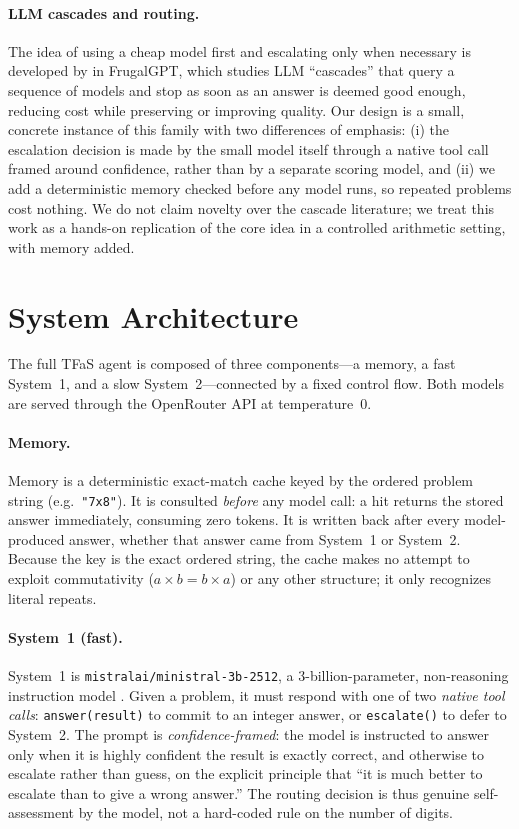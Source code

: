 \documentclass[11pt]{article}
\newcommand{\sysone}{System~1}
\newcommand{\systwo}{System~2}
\begin{document}
\paragraph{LLM cascades and routing.} The idea of using a cheap model first and
escalating only when necessary is developed by \citet{chen2023frugalgpt} in
FrugalGPT, which studies LLM ``cascades'' that query a sequence of models and
stop as soon as an answer is deemed good enough, reducing cost while preserving
or improving quality. Our design is a small, concrete instance of this family
with two differences of emphasis: (i) the escalation decision is made by the
small model itself through a native tool call framed around confidence, rather
than by a separate scoring model, and (ii) we add a deterministic memory checked
before any model runs, so repeated problems cost nothing. We do not claim novelty
over the cascade literature; we treat this work as a hands-on replication of the
core idea in a controlled arithmetic setting, with memory added.

\section{System Architecture}
\label{sec:arch}

The full TFaS agent is composed of three components---a memory, a fast \sysone,
and a slow \systwo---connected by a fixed control flow. Both models are served
through the OpenRouter API at temperature~0.

\paragraph{Memory.} Memory is a deterministic exact-match cache keyed by the
ordered problem string (e.g.\ \texttt{"7x8"}). It is consulted \emph{before} any
model call: a hit returns the stored answer immediately, consuming zero tokens.
It is written back after every model-produced answer, whether that answer came
from \sysone{} or \systwo. Because the key is the exact ordered string, the cache
makes no attempt to exploit commutativity ($a\times b = b\times a$) or any other
structure; it only recognizes literal repeats.

\paragraph{\sysone{} (fast).} \sysone{} is \texttt{mistralai/ministral-3b-2512},
a 3-billion-parameter, non-reasoning instruction model
\citep{mistral2024ministral}. Given a problem, it must respond with one of two
\emph{native tool calls}: \texttt{answer(result)} to commit to an integer
answer, or \texttt{escalate()} to defer to \systwo. The prompt is
\emph{confidence-framed}: the model is instructed to answer only when it is
highly confident the result is exactly correct, and otherwise to escalate rather
than guess, on the explicit principle that ``it is much better to escalate than
to give a wrong answer.'' The routing decision is thus genuine self-assessment by
the model, not a hard-coded rule on the number of digits.
\end{document}
